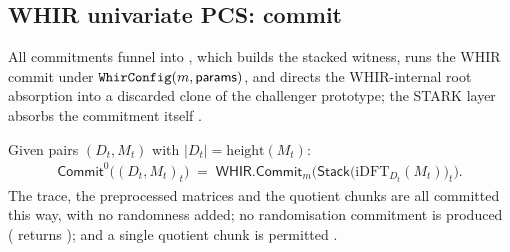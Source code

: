 \subsection{WHIR univariate PCS: commit}
\label{subsec:ps-commit}

All commitments funnel into , which
builds the stacked witness, runs the WHIR commit under
$\texttt{WhirConfig}(m, \mathsf{params})$, and directs the WHIR-internal root
absorption into a discarded clone of the challenger prototype; the STARK layer
absorbs the commitment itself .

\begin{definition}[Non-hiding commitment, $\code{ZK}=\code{false}$]
\label{def:ps-commit0}
Given pairs $(D_t, M_t)$ with $|D_t| = \mathrm{height}(M_t)$:
\begin{align}
  \mathsf{Commit}^{0}\big((D_t,M_t)_t\big) \;=\;
  \mathsf{WHIR.Commit}_{m}\Big(\mathsf{Stack}\big(\mathrm{iDFT}_{D_t}(M_t)\big)_t\Big).
\end{align}
The trace, the preprocessed matrices and the quotient chunks are all committed
this way, with no randomness added; no randomisation commitment is produced
( returns ); and a
single quotient chunk is permitted
.
\end{definition}

